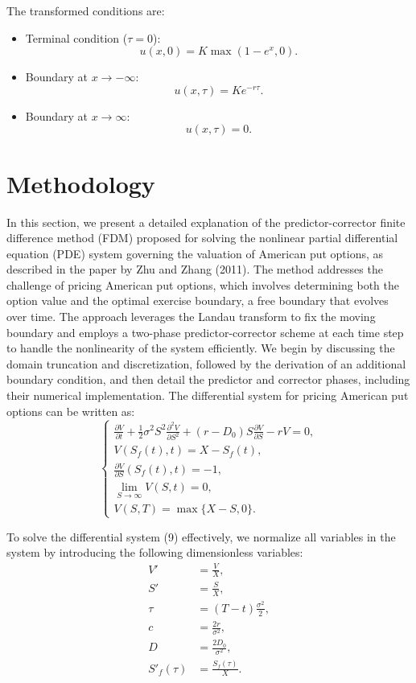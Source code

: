 \documentclass{article}
\begin{document}
The transformed conditions are:
\begin{itemize}
    \item Terminal condition (\( \tau = 0 \)):
    \[
    u(x, 0) = K \max(1 - e^x, 0).
    \]
    \item Boundary at \( x \to -\infty \):
    \[
    u(x, \tau) = K e^{-r \tau}.
    \]
    \item Boundary at \( x \to \infty \):
    \[
    u(x, \tau) = 0.
    \]
\end{itemize}


\appendix
\section{Methodology}
\label{sec:predictor-corrector}

In this section, we present a detailed explanation of the predictor-corrector finite difference method (FDM) proposed for solving the nonlinear partial differential equation (PDE) system governing the valuation of American put options, as described in the paper by Zhu and Zhang (2011). The method addresses the challenge of pricing American put options, which involves determining both the option value and the optimal exercise boundary, a free boundary that evolves over time. The approach leverages the Landau transform to fix the moving boundary and employs a two-phase predictor-corrector scheme at each time step to handle the nonlinearity of the system efficiently. We begin by discussing the domain truncation and discretization, followed by the derivation of an additional boundary condition, and then detail the predictor and corrector phases, including their numerical implementation.
The differential system for pricing American put options can be written as:
\begin{equation}
\begin{cases}
\frac{\partial V}{\partial t} + \frac{1}{2}\sigma^2S^2\frac{\partial^2 V}{\partial S^2} + (r - D_0)S\frac{\partial V}{\partial S} - rV = 0, \\
V(S_f(t),t) = X - S_f(t), \\
\frac{\partial V}{\partial S}(S_f(t),t) = -1, \\
\lim_{S\to\infty} V(S,t) = 0, \\
V(S, T) = \max\{X - S, 0\}.
\end{cases}
\end{equation}

To solve the differential system (9) effectively, we normalize all variables in the system by introducing the following dimensionless variables:
\begin{align*}
V' &= \frac{V}{X}, \\
S' &= \frac{S}{X}, \\
\tau &= (T - t)\frac{\sigma^2}{2}, \\
c &= \frac{2r}{\sigma^2}, \\
D &= \frac{2D_0}{\sigma^2}, \\
S'_f(\tau) &= \frac{S_f(\tau)}{X}.
\end{align*}
\end{document}
